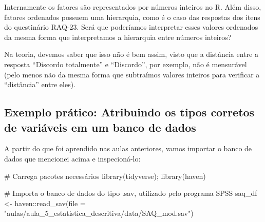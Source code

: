 \documentclass[
  letterpaper,
  DIV=11,
  numbers=noendperiod]{scrartcl}
\newenvironment{Shaded}{\begin{snugshade}}{\end{snugshade}}
\newcommand{\AttributeTok}[1]{\textcolor[rgb]{0.40,0.45,0.13}{#1}}
\newcommand{\CommentTok}[1]{\textcolor[rgb]{0.37,0.37,0.37}{#1}}
\newcommand{\FunctionTok}[1]{\textcolor[rgb]{0.28,0.35,0.67}{#1}}
\newcommand{\NormalTok}[1]{\textcolor[rgb]{0.00,0.23,0.31}{#1}}
\newcommand{\OtherTok}[1]{\textcolor[rgb]{0.00,0.23,0.31}{#1}}
\newcommand{\SpecialCharTok}[1]{\textcolor[rgb]{0.37,0.37,0.37}{#1}}
\newcommand{\StringTok}[1]{\textcolor[rgb]{0.13,0.47,0.30}{#1}}
\begin{document}
\begin{tcolorbox}[enhanced jigsaw, opacitybacktitle=0.6, bottomtitle=1mm, left=2mm, arc=.35mm, colback=white, breakable, colbacktitle=quarto-callout-note-color!10!white, colframe=quarto-callout-note-color-frame, opacityback=0, toprule=.15mm, toptitle=1mm, coltitle=black, titlerule=0mm, title=\textcolor{quarto-callout-note-color}{\faInfo}\hspace{0.5em}{Fatores ordenados são variáveis numéricas?}, bottomrule=.15mm, rightrule=.15mm, leftrule=.75mm]

Internamente os fatores são representados por números inteiros no R.
Além disso, fatores ordenados possuem uma hierarquia, como é o caso das
respostas dos itens do questinário RAQ-23. Será que poderíamos
interpretar esses valores ordenados da mesma forma que interpretamos a
hierarquia entre números inteiros?

Na teoria, devemos saber que isso não é bem assim, visto que a distância
entre a resposta ``Discordo totalmente'' e ``Discordo'', por exemplo,
não é mensurável (pelo menos não da mesma forma que subtraímos valores
inteiros para verificar a ``distância'' entre eles).

\end{tcolorbox}

\hypertarget{exemplo-pruxe1tico-atribuindo-os-tipos-corretos-de-variuxe1veis-em-um-banco-de-dados}{%
\subsection{Exemplo prático: Atribuindo os tipos corretos de variáveis
em um banco de
dados}\label{exemplo-pruxe1tico-atribuindo-os-tipos-corretos-de-variuxe1veis-em-um-banco-de-dados}}

A partir do que foi aprendido nas aulas anteriores, vamos importar o
banco de dados que mencionei acima e inspecioná-lo:

\begin{Shaded}
\begin{Highlighting}[]
\CommentTok{\# Carrega pacotes necessários}
\FunctionTok{library}\NormalTok{(tidyverse); }\FunctionTok{library}\NormalTok{(haven)}

\CommentTok{\# Importa o banco de dados do tipo .sav, utilizado pelo programa SPSS}
\NormalTok{saq\_df }\OtherTok{\textless{}{-}}\NormalTok{ haven}\SpecialCharTok{::}\FunctionTok{read\_sav}\NormalTok{(}\AttributeTok{file =} \StringTok{"aulas/aula\_5\_estatistica\_descritiva/data/SAQ\_mod.sav"}\NormalTok{)}
\end{Highlighting}
\end{Shaded}
\end{document}
